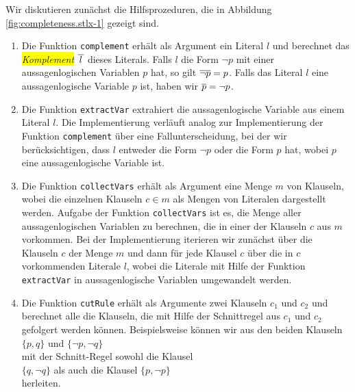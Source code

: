 Wir diskutieren zun\"{a}chst die Hilfsprozeduren, die in Abbildung \ref{fig:completeness.stlx-1} gezeigt
sind. 
\begin{enumerate}
\item Die Funktion \texttt{complement} erh\"{a}lt als Argument ein Literal $l$ und berechnet das
      \colorbox{yellow}{\emph{Komplement}} $\overline{\,l\,}$ dieses Literals.  Falls $l$ die Form $\neg p$ mit einer
      aussagenlogischen Variablen $p$ hat, so gilt $\overline{\neg p} = p$.   Falls das Literal
      $l$ eine aussagenlogische Variable $p$ ist, haben wir $\overline{p} = \neg p$.
\item Die Funktion \texttt{extractVar} extrahiert die aussagenlogische Variable aus einem Literal $l$.
      Die Implementierung verl\"{a}uft analog zur Implementierung der Funktion \texttt{complement} \"{u}ber eine
      Fallunterscheidung, bei der wir ber\"{u}cksichtigen, dass $l$ entweder die Form $\neg p$ oder die
      Form $p$ hat, wobei $p$ eine aussagenlogische Variable ist.
\item Die Funktion \texttt{collectVars} erh\"{a}lt als Argument eine Menge $m$ von Klauseln, wobei die
      einzelnen Klauseln $c \in m$ als Mengen von Literalen dargestellt werden.  Aufgabe der
      Funktion \texttt{collectVars} ist es, die Menge aller aussagenlogischen Variablen zu
      berechnen, die in einer der Klauseln $c$ aus $m$ vorkommen.  Bei der Implementierung iterieren
      wir zun\"{a}chst \"{u}ber die Klauseln $c$ der Menge $m$ und dann f\"{u}r jede Klausel $c$ \"{u}ber die in $c$
      vorkommenden Literale $l$, wobei die Literale mit Hilfe der Funktion \texttt{extractVar} in
      aussagenlogische Variablen umgewandelt werden.
\item Die Funktion \texttt{cutRule} erh\"{a}lt als Argumente zwei Klauseln $c_1$ und $c_2$ und berechnet
      alle die Klauseln, die mit Hilfe der Schnittregel aus $c_1$ und $c_2$ gefolgert werden
      k\"{o}nnen.  Beispielsweise k\"{o}nnen wir aus den beiden Klauseln
      \\[0.2cm]
      \hspace*{1.3cm}
      $\{ p, q \}$ \quad und \quad $\{ \neg p, \neg q \}$ 
      \\[0.2cm]
      mit der Schnitt-Regel sowohl die Klausel
      \\[0.2cm]
      \hspace*{1.3cm}
      $\{q, \neg q\}$ \quad als auch die Klausel \quad $\{p, \neg p \}$
      \\[0.2cm]
      herleiten.
\end{enumerate}

